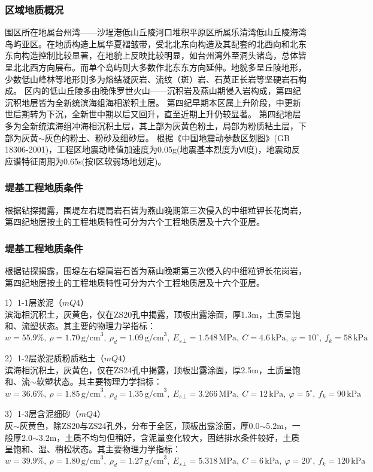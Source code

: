 \documentclass[UTF8, a4paper, 12pt]{ctexart} %
\begin{document}
\subsubsection{区域地质概况}
围区所在地属台州湾——沙埕港低山丘陵河口堆积平原区所属乐清湾低山丘陵海湾岛屿亚区。在地质构造上属华夏褶皱带，受北北东向构造及其配套的北西向和北东东向构造控制比较显著，在地貌上反映比较明显，如台州湾外至洞头诸岛，总体皆呈北北西方向展布。而单个岛屿则大多数作北东东方向延伸。地貌多呈丘陵地形，少数低山峰林等地形则多为熔结凝灰岩、流纹（斑）岩、石英正长岩等坚硬岩石构成。
区内的低山丘陵多由晚侏罗世火山——沉积岩及燕山期侵入岩构成，第四纪沉积地层皆为全新统滨海组海相淤积土层。
第四纪早期本区属上升阶段，中更新世后期转为下沉，全新世中期以后又回升，直至近期上升仍较显著。
第四纪地层多为全新统滨海组冲海相沉积土层，其上部为灰黄色粉土，局部为粉质粘土层，下部为灰黄$\sim$灰色的粉土、粉砂及细砂层。
根据《中国地震动参数区划图》(GB 18306-2001)，工程区地震动峰值加速度为0.05g(地震基本烈度为Ⅵ度)，地震动反应谱特征周期为0.65s(按Ⅰ区软弱场地划定)。
\subsubsection{堤基工程地质条件}
根据钻探揭露，围堤左右堤肩岩石皆为燕山晚期第三次侵入的中细粒钾长花岗岩，第四纪地层按土的工程地质特性可分为六个工程地质层及十六个亚层。
\subsubsection{堤基工程地质条件}
根据钻探揭露，围堤左右堤肩岩石皆为燕山晚期第三次侵入的中细粒钾长花岗岩，第四纪地层按土的工程地质特性可分为六个工程地质层及十六个亚层。

\par 1）1-1层淤泥（$mQ4$）\\
滨海相沉积土，灰黄色，仅在ZS20孔中揭露，顶板出露涂面，厚1.3m，土质呈饱和、流塑状态。其主要的物理力学指标：
\[
w=55.9\%,\ \rho=1.70\, \text{g/cm}^3,\ \rho_d=1.09\, \text{g/cm}^3,\ E_s{_\perp}=1.548\, \text{MPa},\ C=4.6\, \text{kPa},\ \varphi=10^\circ,\ f_k=58\, \text{kPa}
\]

\par 2）1-2层淤泥质粉质粘土（$mQ4$）\\
滨海相沉积土，灰黄色，仅在ZS24孔中揭露，顶板出露涂面，厚2.5m，土质呈饱和、流$\sim$软塑状态。其主要物理力学指标：
\[
w=36.6\%,\ \rho=1.85\, \text{g/cm}^3,\ \rho_d=1.35\, \text{g/cm}^3,\ E_s{_\perp}=3.266\, \text{MPa},\ C=12\, \text{kPa},\ \varphi=5^\circ,\ f_k=90\, \text{kPa}
\]

\par 3）1-3层含泥细砂（$mQ4$）\\
灰$\sim$灰黄色，除ZS20与ZS24孔外，分布于全区，顶板出露涂面，厚0.0$\sim$5.2m，一般厚2.0$\sim$3.2m，土质不均匀但稍好，含泥量变化较大，固结排水条件较好，土质呈饱和、湿、稍松状态。其主要物理力学指标：
\[
w=39.9\%,\ \rho=1.80\, \text{g/cm}^3,\ \rho_d=1.27\, \text{g/cm}^3,\ E_s{_\perp}=5.318\, \text{MPa},\ C=6\, \text{kPa},\ \varphi=20^\circ,\ f_k=120\, \text{kPa}
\]
\end{document}
